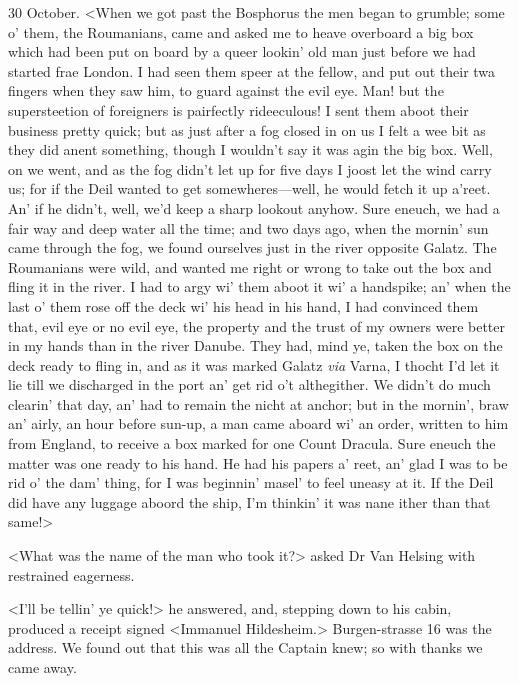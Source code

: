 \begin{diary}{30 October.}
<When we got past the Bosphorus the men began to grumble; some o' them, the Roumanians, came and asked me to heave overboard a big box which had been put on board by a queer lookin' old man just before we had started frae London. I had seen them speer at the fellow, and put out their twa fingers when they saw him, to guard against the evil eye. Man! but the supersteetion of foreigners is pairfectly rideeculous! I sent them aboot their business pretty quick; but as just after a fog closed in on us I felt a wee bit as they did anent something, though I wouldn't say it was agin the big box. Well, on we went, and as the fog didn't let up for five days I joost let the wind carry us; for if the Deil wanted to get somewheres—well, he would fetch it up a'reet. An' if he didn't, well, we'd keep a sharp lookout anyhow. Sure eneuch, we had a fair way and deep water all the time; and two days ago, when the mornin' sun came through the fog, we found ourselves just in the river opposite Galatz. The Roumanians were wild, and wanted me right or wrong to take out the box and fling it in the river. I had to argy wi' them aboot it wi' a handspike; an' when the last o' them rose off the deck wi' his head in his hand, I had convinced them that, evil eye or no evil eye, the property and the trust of my owners were better in my hands than in the river Danube. They had, mind ye, taken the box on the deck ready to fling in, and as it was marked Galatz \textit{via} Varna, I thocht I'd let it lie till we discharged in the port an' get rid o't althegither. We didn't do much clearin' that day, an' had to remain the nicht at anchor; but in the mornin', braw an' airly, an hour before sun-up, a man came aboard wi' an order, written to him from England, to receive a box marked for one Count Dracula. Sure eneuch the matter was one ready to his hand. He had his papers a' reet, an' glad I was to be rid o' the dam' thing, for I was beginnin' masel' to feel uneasy at it. If the Deil did have any luggage aboord the ship, I'm thinkin' it was nane ither than that same!>

<What was the name of the man who took it?> asked Dr Van Helsing with restrained eagerness.

<I'll be tellin' ye quick!> he answered, and, stepping down to his cabin, produced a receipt signed <Immanuel Hildesheim.> Burgen-strasse 16 was the address. We found out that this was all the Captain knew; so with thanks we came away.


\end{diary}
